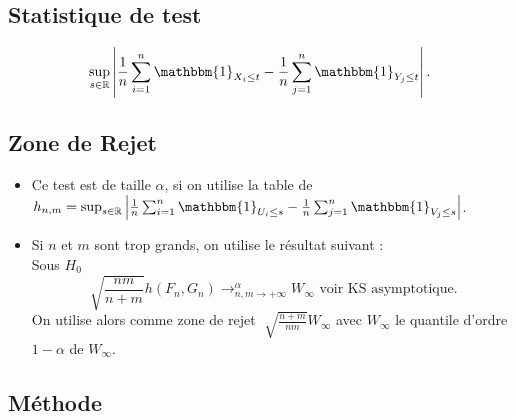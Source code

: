 \documentclass{article}
\theoremstyle{plain}%
\theoremstyle{definition}
\theoremstyle{remark}
\begin{document}
\subsection*{Statistique de test}
\[
    \sup _{s \in \mathbb{R}} \left| \frac{1}{n}\sum_{i=1}^{n} \mathbbm{1}_{X_i \leq t} - \frac{1}{n}\sum_{j=1}^{n} \mathbbm{1}_{Y_j \leq t} \right| 
.\]
\subsection*{Zone de Rejet}
\begin{itemize}
    \item Ce test est de taille $ \alpha  $, si on utilise la table de $ h_{n,m} = \sup _{s \in \mathbb{R}} \left| \frac{1}{n}\sum_{i=1}^{n} \mathbbm{1}_{U_i \leq s} - \frac{1}{n}\sum_{j=1}^{n} \mathbbm{1}_{V_j \leq s} \right| $.
    \item Si $ n $ et $ m $ sont trop grands, on utilise le résultat suivant : \\
        Sous $ H_0 $ 
        \[
            \sqrt[]{\frac{nm}{n+m}}h(F_n, G_n) \to ^{\alpha }_{n,m \to +\infty } W_\infty \text{ voir KS asymptotique}
        .\]
        On utilise alors comme zone de rejet $ \sqrt[]{\frac{n+m}{nm}}W_\infty  $ avec $ W_\infty  $ le quantile d'ordre $ 1 - \alpha  $ de $ W_\infty  $.
\end{itemize}

\subsection*{Méthode}
\end{document}
